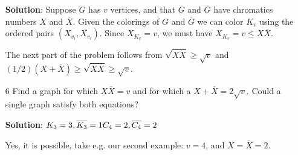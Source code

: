 \documentclass{article}
\begin{document}
\begin{enumerate}
		\textbf{Solution}: Suppose $G$ has $v$ vertices, and that $G$ and $\overline{G}$ have chromatics numbers $X$ and $\overline{X}$. Given the colorings of $G$ and $\overline{G}$ we can color $K_v$ using the ordered pairs $(X_{v_i}, \overline{X_{v_i}})$. Since $X_{K_v} = v$, we must have $X_{K_v} = v \leq X\overline{X}$.
		
		The next part of the problem follows from $\sqrt{X\overline{X}} \geq \sqrt{v}$ and $(1/2)(X + \overline{X}) \geq \sqrt{X\overline{X}} \geq \sqrt{v}$.
		
		\item[6] Find a graph for which $X\overline{X} = v$ and for which a $X + \overline{X} = 2\sqrt{v}$. Could a single graph satisfy both equations?
		
		\textbf{Solution}:
		$\\
		K_3 = 3, \smallskip \overline{K_3} = 1 \\
		C_4 = 2, \overline{C_4} = 2
		$
		
		Yes, it is possible, take e.g. our second example: $v = 4$, and $X = \overline{X} = 2$.
		
	\end{enumerate}
\end{document}
